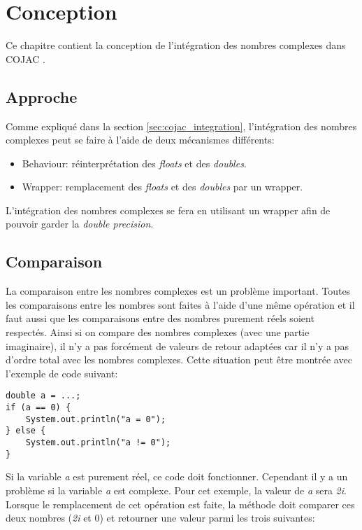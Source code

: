 \section{Conception}

Ce chapitre contient la conception de l'intégration des nombres complexes dans COJAC \cite{COJAC}.

\subsection{Approche}
\label{sec:complex_approach}

Comme expliqué dans la section \ref{sec:cojac_integration}, l'intégration des nombres complexes peut se faire à l'aide de deux mécanismes différents:
\begin{itemize}
    \item Behaviour: réinterprétation des \textit{floats} et des \textit{doubles}.
    \item Wrapper: remplacement des \textit{floats} et des \textit{doubles} par un wrapper.
\end{itemize}

L'intégration des nombres complexes se fera en utilisant un wrapper afin de pouvoir garder la \textit{double precision}.

\subsection{Comparaison}
\label{sec:complex_design_comparison}

La comparaison entre les nombres complexes est un problème important. Toutes les comparaisons entre les nombres sont faites à l'aide d'une même opération et il faut aussi que les comparaisons entre des nombres purement réels soient respectés. Ainsi si on compare des nombres complexes (avec une partie imaginaire), il n'y a pas forcément de valeurs de retour adaptées car il n'y a pas d'ordre total avec les nombres complexes. Cette situation peut être montrée avec l'exemple de code suivant:

\begin{verbatim}
double a = ...;
if (a == 0) {
    System.out.println("a = 0");
} else {
    System.out.println("a != 0");
}
\end{verbatim}

Si la variable \textit{a} est purement réel, ce code doit fonctionner. Cependant il y a un problème si la variable \textit{a} est complexe. Pour cet exemple, la valeur de \textit{a} sera \textit{2i}. Lorsque le remplacement de cet opération est faite, la méthode doit comparer ces deux nombres (\textit{2i} et 0) et retourner une valeur parmi les trois suivantes:


